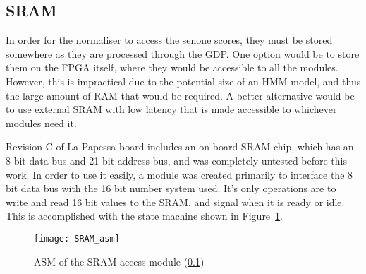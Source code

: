 	\subsection{SRAM} %
	\label{sub:onboard_sram}
		In order for the normaliser to access the senone scores, they must be stored somewhere as they are processed through the GDP.  One option would be to store them on the FPGA itself, where they would be accessible to all the modules.  However, this is impractical due to the potential size of an HMM model, and thus the large amount of RAM that would be required.  A better alternative would be to use external SRAM with low latency that is made accessible to whichever modules need it.

		Revision C of La Papessa board includes an on-board SRAM chip, which has an 8 bit data bus and 21 bit address bus, and was completely untested before this work.  In order to use it easily, a module was created primarily to interface the 8 bit data bus with the 16 bit number system used.  It's only operations are to write and read 16 bit values to the SRAM, and signal when it is ready or idle.  This is accomplished with the state machine shown in Figure~\ref{fig:sram_asm}.

		\begin{figure}[tb]
			\begin{center}
				\texttt{[image: SRAM\_asm]}
			\end{center}
			\caption{ASM of the SRAM access module (\ref{sub:onboard_sram})}
			\label{fig:sram_asm}
		\end{figure}

